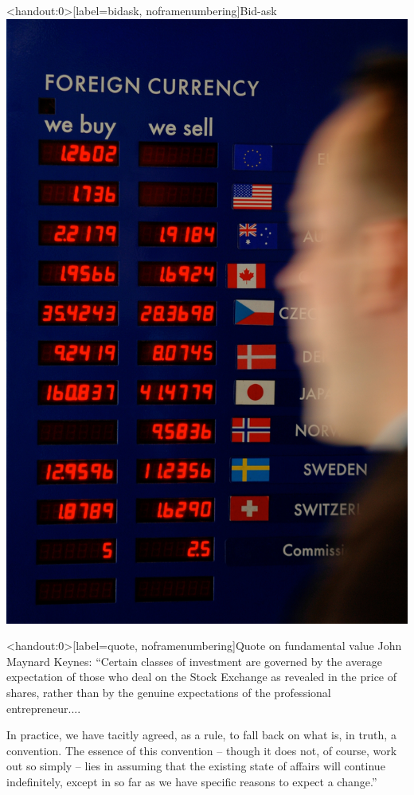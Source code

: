 \documentclass[english,10pt
,aspectratio=169
]{beamer}
\begin{document}
\begin{frame}<handout:0>[label=bidask, noframenumbering]{Bid-ask}
	\centering
	\includegraphics[width=.3\paperwidth]{pics/Image_XRates}
	\hyperlink{main2}{}
\end{frame}


\begin{frame}<handout:0>[label=quote, noframenumbering]{Quote on fundamental value}
	John Maynard Keynes:
	``Certain classes of investment are governed by the average expectation of those who deal on the Stock Exchange as revealed in the price of shares, rather than by the genuine expectations of the professional entrepreneur.... 
	
	\quad
	
	In practice, we have tacitly agreed, as a rule, to fall back on what is, in truth, a convention. The essence of this convention -- though it does not, of course, work out so simply -- lies in assuming that the existing state of affairs will continue indefinitely, except in so far as we have specific reasons to expect a change.''
	\hyperlink{main4}{}
\end{frame}
\end{document}
